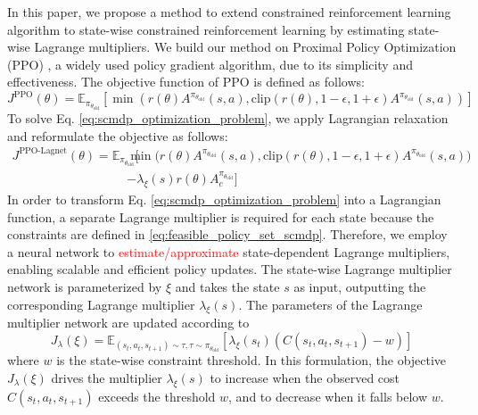 In this paper, we propose a method to extend constrained reinforcement learning algorithm to state-wise constrained reinforcement learning by estimating state-wise Lagrange multipliers.
We build our method on Proximal Policy Optimization (PPO) \cite{schulman2017proximal}, a widely used policy gradient algorithm, due to its simplicity and effectiveness.
The objective function of PPO is defined as follows:
\begin{equation} 
    J^{\text{PPO}}(\theta) = \mathbb{E}_{\pi_{\theta_\text{old}}} \left[ \min \left( r(\theta) A^{\pi_{\theta_\text{old}}}(s, a), \text{clip}(r(\theta), 1 - \epsilon, 1 + \epsilon) A^{\pi_{\theta_\text{old}}}(s, a) \right) \right] 
\end{equation}
To solve Eq. \eqref{eq:scmdp_optimization_problem}, we apply Lagrangian relaxation and reformulate the objective as follows:
\begin{equation} 
    \begin{aligned} J^{\text{PPO-Lagnet}}(\theta) 
        = \mathbb{E}_{\pi_{\theta_\text{old}}} \Big[ &\min \big( r(\theta) A^{\pi_{\theta_\text{old}}}(s, a), \text{clip}(r(\theta), 1 - \epsilon, 1 + \epsilon) A^{\pi_{\theta_\text{old}}}(s, a) \big) 
        \\ &- \lambda_\xi(s) r(\theta) A^{\pi_{\theta_\text{old}}}_c \Big] 
    \end{aligned} 
\end{equation}
In order to transform Eq. \eqref{eq:scmdp_optimization_problem} into a Lagrangian function, a separate Lagrange multiplier is required for each state because the constraints are defined in \eqref{eq:feasible_policy_set_scmdp}.
Therefore, we employ a neural network to \textcolor{red}{estimate/approximate} state-dependent Lagrange multipliers, enabling scalable and efficient policy updates.
The state-wise Lagrange multiplier network is parameterized by $\xi$ and takes the state $s$ as input, outputting the corresponding Lagrange multiplier $\lambda_\xi(s)$.
The parameters of the Lagrange multiplier network are updated according to
\begin{equation}
    J_\lambda(\xi) = \mathbb{E}_{(s_t, a_t, s_{t + 1}) \sim \tau, \tau \sim \pi_{\theta_\text{old}}} [\lambda_\xi(s_t) (C(s_t, a_t, s_{t + 1}) - w)]
\end{equation}
where $w$ is the state-wise constraint threshold. 
In this formulation, the objective $J_\lambda(\xi)$ drives the multiplier $\lambda_\xi(s)$ to increase when the observed cost $C(s_t, a_t, s_{t+1})$ exceeds the threshold $w$, and to decrease when it falls below $w$.
